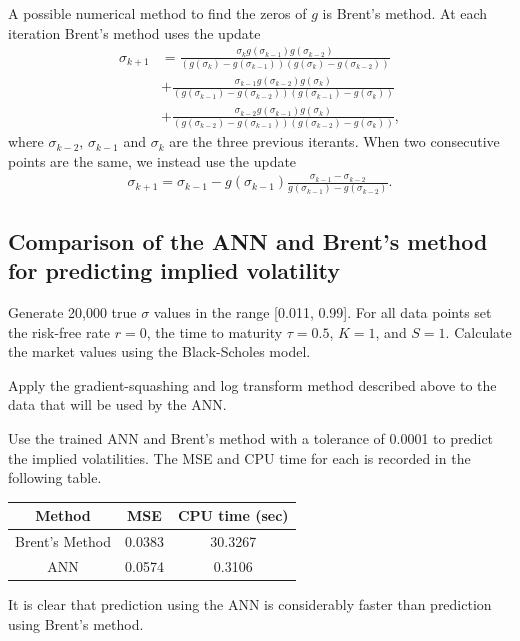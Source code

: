 \documentclass[12pt,a4paper]{article}
\begin{document}
A possible numerical method to find the zeros of $g$ is Brent's method. At each iteration Brent's method uses the update
\begin{align}
    \sigma_{k+1} &= \frac{\sigma_kg(\sigma_{k-1})g(\sigma_{k-2})}{(g(\sigma_{k})-g(\sigma_{k-1}))(g(\sigma_k)-g(\sigma_{k-2}))} \nonumber \\
    &+ \frac{\sigma_{k-1}g(\sigma_{k-2})g(\sigma_{k})}{(g(\sigma_{k-1})-g(\sigma_{k-2}))(g(\sigma_{k-1})-g(\sigma_{k}))} \\
    &+ \frac{\sigma_{k-2}g(\sigma_{k-1})g(\sigma_{k})}{(g(\sigma_{k-2})-g(\sigma_{k-1}))(g(\sigma_{k-2})-g(\sigma_{k}))}, \nonumber
\end{align}
where $\sigma_{k-2}$, $\sigma_{k-1}$ and $\sigma_{k}$ are the three previous iterants. When two consecutive points are the same, we instead use the update
\begin{align}
    \sigma_{k+1} = \sigma_{k-1} - g(\sigma_{k-1})\frac{\sigma_{k-1} - \sigma_{k-2}}{g(\sigma_{k-1})-g(\sigma_{k-2})}.
\end{align}

\subsection{Comparison of the ANN and Brent's method for predicting implied volatility}
Generate 20,000 true $\sigma$ values in the range [0.011, 0.99]. For all data points set the risk-free rate $r=0$, the time to maturity $\tau=0.5$, $K = 1$, and $S = 1$. Calculate the market values using the Black-Scholes model.

Apply the gradient-squashing and log transform method described above to the data that will be used by the ANN.

Use the trained ANN and Brent's method with a tolerance of 0.0001 to predict the implied volatilities. The MSE and CPU time for each is recorded in the following table.

\begin{center}
\begin{tabular}{ |c|c|c| } 
 \hline
 Method & MSE & CPU time (sec) \\ 
 \hline
 Brent's Method & 0.0383 & 30.3267 \\ 
 ANN & 0.0574 & 0.3106 \\ 
 \hline
\end{tabular}
\end{center}

It is clear that prediction using the ANN is considerably faster than prediction using Brent's method.
\end{document}
